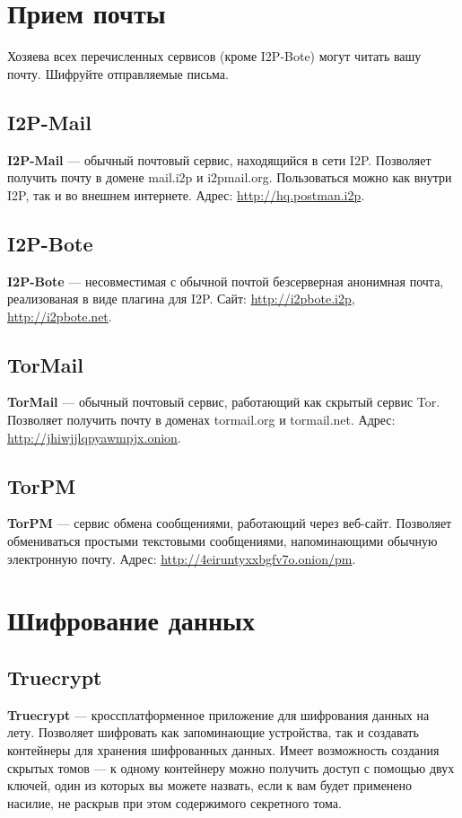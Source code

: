 \section{Прием почты}
\begin{important}
Хозяева всех перечисленных сервисов (кроме I2P-Bote) могут читать вашу почту. Шифруйте отправляемые письма.
\end{important}
\subsection{I2P-Mail}
\textbf{I2P-Mail} --- обычный почтовый сервис, находящийся в сети I2P. Позволяет получить почту в домене mail.i2p и i2pmail.org. Пользоваться можно как внутри I2P, так и во внешнем интернете. Адрес: \url{http://hq.postman.i2p}.
\subsection{I2P-Bote}
\textbf{I2P-Bote} --- несовместимая с обычной почтой безсерверная анонимная почта, реализованая в виде плагина для I2P. Сайт: \url{http://i2pbote.i2p}, \url{http://i2pbote.net}.
\subsection{TorMail}
\textbf{TorMail} --- обычный почтовый сервис, работающий как скрытый сервис Tor. Позволяет получить почту в доменах tormail.org и tormail.net. Адрес: \url{http://jhiwjjlqpyawmpjx.onion}.
\subsection{TorPM}
\textbf{TorPM} --- сервис обмена сообщениями, работающий через веб-сайт. Позволяет обмениваться простыми текстовыми сообщениями, напоминающими обычную электронную почту. Адрес: \url{http://4eiruntyxxbgfv7o.onion/pm}.

\section{Шифрование данных}
\subsection{Truecrypt}
\textbf{Truecrypt} --- кроссплатформенное приложение для шифрования данных на лету. Позволяет шифровать как запоминающие устройства, так и создавать контейнеры для хранения шифрованных данных. Имеет возможность создания скрытых томов --- к одному контейнеру можно получить доступ с помощью двух ключей, один из которых вы можете назвать, если к вам будет применено насилие, не раскрыв при этом содержимого секретного тома.
